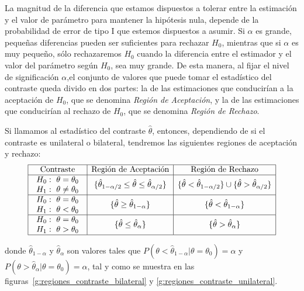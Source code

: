 La magnitud de la diferencia que estamos dispuestos a tolerar entre la estimación y el valor de parámetro para mantener
la hipótesis nula, depende de la probabilidad de error de tipo I que estemos dispuestos a asumir.
Si $\alpha$ es grande, pequeñas diferencias pueden ser suficientes para rechazar $H_0$, mientras que si $\alpha$ es muy
pequeño, sólo rechazaremos $H_0$ cuando la diferencia entre el estimador y el valor del parámetro según $H_0$, sea muy
grande.
De esta manera, al fijar el nivel de significación $\alpha$,el conjunto de valores que puede tomar el estadístico del
contraste queda divido en dos partes: la de las estimaciones que conducirían a la aceptación de $H_0$, que se denomina
\emph{Región de Aceptación}, y la de las estimaciones que conducirían al rechazo de $H_0$, que se denomina \emph{Región
de Rechazo}.

Si llamamos al estadístico del contraste $\hat{\theta}$, entonces, dependiendo de si el contraste es unilateral o
bilateral, tendremos las siguientes regiones de aceptación y rechazo:
\[
\begin{array}{|c|c|c|}
\hline
\textrm{Contraste} & \textrm{Región de Aceptación} & \textrm{Región de Rechazo} \\
\hline
\begin{array}{l}
H_0:\ \theta=\theta_0\\
H_1:\ \theta\neq \theta_0
\end{array}
& \{\hat{\theta}_{1-\alpha/2}\leq \hat{\theta}\leq \hat{\theta}_{\alpha/2}\} &
\{\hat{\theta}<\hat{\theta}_{1-\alpha/2}\}\cup \{
\hat{\theta}>\hat{\theta}_{\alpha/2}\}\\
\hline
\begin{array}{l}
H_0:\ \theta=\theta_0\\
H_1:\ \theta<\theta_0
\end{array}
& \{\hat{\theta}\geq\hat{\theta}_{1-\alpha}\} &
\{\hat{\theta}<\hat{\theta}_{1-\alpha}\}\\
\hline
\begin{array}{l}
H_0:\ \theta=\theta_0\\
H_1:\ \theta>\theta_0
\end{array}
& \{\hat{\theta}\leq \hat{\theta}_{\alpha}\} &
\{\hat{\theta}>\hat{\theta}_{\alpha}\}\\
\hline
\end{array}
\]

donde $\hat{\theta}_{1-\alpha}$ y $\hat{\theta}_{\alpha}$ son valores tales que
$P(\theta<\hat{\theta}_{1-\alpha}|\theta=\theta_0)=\alpha$ y $P(\theta>\hat{\theta}_{\alpha}|\theta=\theta_0)=\alpha$,
tal y como se muestra en las figuras~\ref{g:regiones_contraste_bilateral} y \ref{g:regiones_contraste_unilateral}.


